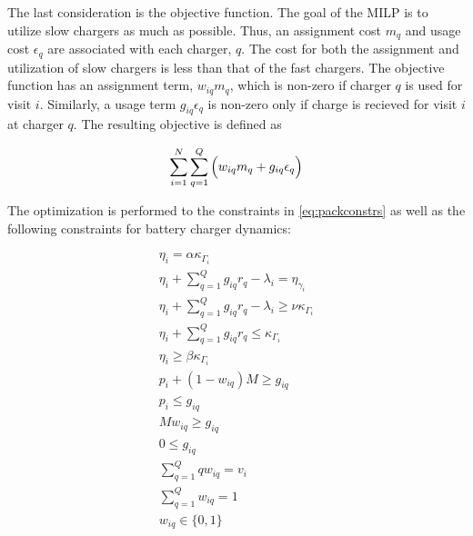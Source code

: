 \documentclass[letterpaper, 10pt, conference]{IEEEtran}
\begin{document}
The last consideration is the objective function. The goal of the MILP is to utilize slow chargers as much as possible. Thus, an assignment cost \(m_q\) and usage cost \(\epsilon_q\) are associated with each charger, \(q\). The cost for both the assignment and utilization of slow chargers is less than that of the fast chargers. The objective function has an assignment term, \(w_{iq}m_q\), which is non-zero if charger \(q\) is used for visit \(i\). Similarly, a usage term \(g_{iq} \epsilon_q\) is non-zero only if charge is recieved for visit \(i\) at charger \(q\). The resulting objective is defined as

\begin{equation}
\label{eq:objective}
	\sum_{i=1}^N \sum_{q=1}^Q \Big( w_{iq} m_q + g_{iq} \epsilon_q \Big) \\
\end{equation}

\noindent
The optimization is performed to the constraints in \eqref{eq:packconstrs} as well as the following constraints for battery charger dynamics:

\begin{subequations}
\label{eq:dynconstrs}
\begin{align}
    \eta_i = \alpha \kappa_{\Gamma_i}                                         \label{subeq:init_charge}  \\
    \eta_i + \sum_{q=1}^Q g_{iq} r_q - \lambda_i = \eta_{\gamma_i}            \label{subeq:next_charge}  \\
    \eta_i + \sum_{q=1}^Q g_{iq} r_q - \lambda_i \geq \nu \kappa_{\Gamma_i}   \label{subeq:min_charge}   \\
    \eta_i + \sum_{q=1}^Q g_{iq} r_q \leq \kappa_{\Gamma_i}                   \label{subeq:max_charge}   \\
    \eta_i \geq \beta \kappa_{\Gamma_i}                                       \label{subeq:final_charge} \\
    p_i + (1 - w_{iq})M \geq g_{iq}                                           \label{subeq:gpgret}       \\
    p_i \leq g_{iq}                                                           \label{subeq:gples}        \\
    Mw_{iq} \geq g_{iq}                                                       \label{subeq:gwgret}       \\
    0 \leq g_{iq}                                                             \label{subeq:gwles}        \\
    \sum_{q=1}^Q qw_{iq} = v_i                                                \label{subeq:wmax}         \\
    \sum_{q=1}^Q w_{iq} = 1                                                   \label{subeq:wone}         \\
    w_{iq} \in \{0,1\}                                                        \label{subeq:wspace}
\end{align}
\end{subequations}
\end{document}
